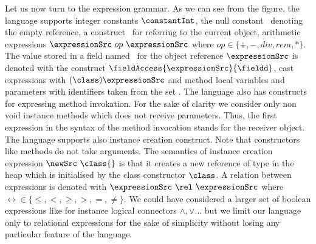 %

Let us now turn to the expression grammar. As we can see from the figure, the language supports 
    integer constants $\constantInt$, the null constant \Mynull \ 
    denoting  the empty reference, a construct \this \ for referring to the current object,  
    arithmetic expressions  $\expressionSrc \ op \ \expressionSrc$ where $op \in  \{+ , - , div , rem, * \}$.
    The value stored in a field named \fieldd \ for the object reference $\expressionSrc $ is denoted with
    the construct  $ \fieldAccess{\expressionSrc}{\fieldd} $, cast expressions with   $(\class) \expressionSrc$
    and method local variables  and parameters with identifiers taken from the set  \var.  
    The language also has constructs for expressing method invokation.  For the sake of clarity we consider only non void  instance  methods which does not 
    receive parameters.
    Thus, the first expression in the syntax of the method invocation stands for the receiver object.  
    The language supports also instance creation construct. Note that constructors like methods do not take arguments.
    The semantics of instance creation expression $\newSrc \ \class{}$  is that it 
    creates a new reference of type \class{} in the heap  which is initialised by the class constructor $\class$.
    A relation between    expressions is denoted with
    $\expressionSrc \ \rel \ \expressionSrc $ where $\rel  \in \{ \le, < ,  \ge, >, = , \neq \}$.  
    We could have considered a larger set of boolean expressions like for instance logical connectors $\wedge, \vee \ldots$
     but we limit our language only to  relational expressions for the sake of simplicity without losing any particular feature of the language.
